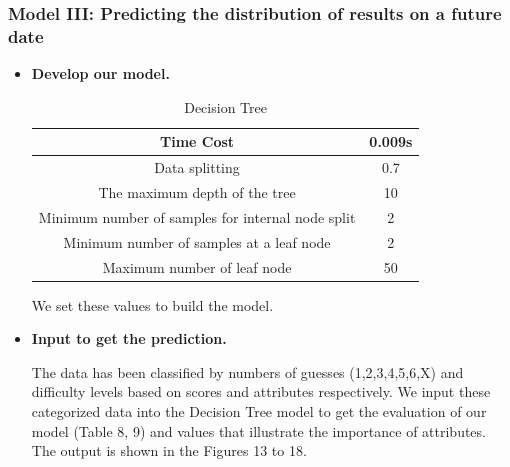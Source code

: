 \documentclass{mcmthesis}
\begin{document}
\subsubsection{Model III: Predicting the distribution of results on a future date}

\begin{itemize}
    \item {\bf Develop our model.}
    \begin{table}[H]  %
        \centering        %
        \caption{Decision Tree}  %
        \vspace{0.2cm}
        \label{tab7}                       %
        \renewcommand\arraystretch{1.2}
        \begin{tabular}{|c|c|}  %
        \hline                    %
        Time Cost & 0.009s \\ \hline  %
        Data splitting & 	0.7   \\ \hline
        The maximum depth of the tree &  10   \\ \hline
        Minimum number of samples for internal node split &	2   \\ \hline
        Minimum number of samples at a leaf node &	2   \\ \hline
        Maximum number of  leaf node &	50  \\ \hline
        \end{tabular}
    \end{table}
    We set these values to build the model.

    \item {\bf Input to get the prediction.}
    
    The data has been classified by numbers of guesses (1,2,3,4,5,6,X) and difficulty levels based on scores and attributes respectively. We input these categorized data into the Decision Tree model to get the evaluation of our model (Table 8, 9) and values that illustrate the importance of attributes. The output is shown in the Figures 13 to 18.


\end{itemize}
\end{document}
